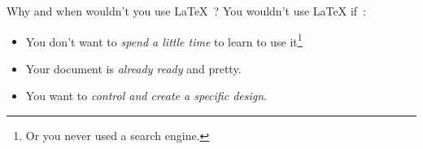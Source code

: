 \documentclass[aspectratio=169]{beamer}
\begin{document}
\begin{frame}{Why and when wouldn't you use \LaTeX~?}
  You wouldn't use \LaTeX{} if~:\pause{}
  \begin{itemize}[<+->]
    \item You don't want to \emph{spend a little time} to learn to use it\footnote{Or you never used a search engine.}
    \item Your document is \emph{already ready} and pretty.
    \item You want to \emph{control and create a specific design}.
  \end{itemize}
\end{frame}
\end{document}
